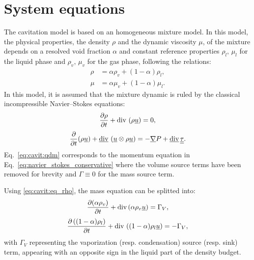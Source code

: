 \section{System equations}
\label{sec:cavit:system_equations}
The cavitation model is based on an homogeneous mixture model. In this
model, the physical properties, the density $\rho$ and the dynamic
viscosity $\mu$, of the mixture depends on a resolved void fraction
$\alpha$ and constant reference properties $\rho_l, \, \mu_l$ for the
liquid phase and $\rho_v, \, \mu_v$ for the gas phase, following the
relations:
\begin{align}
\label{eq:cavit:eq_rho}\rho&= \alpha\rho_v+(1-\alpha)\rho_l, \\
\label{eq:cavit:eq_mu}\mu&= \alpha\mu_v+(1-\alpha)\mu_l.
\end{align}
In this model, it is assumed that the mixture dynamic is ruled by the
classical incompressible Navier--Stokes equations:
\begin{equation}
\label{eq:cavit:mass}
\frac{\partial\rho}{\partial t}+\text{div}\, \left(\rho\underline{u} \right) = 0,
\end{equation}
\begin{equation}
\label{eq:cavit:qdm}
\dfrac{\partial }{\partial t}(\rho \underline{u})
+\underline{\text{div}}\, \left( \underline{u}\otimes \rho \underline{u} \right)
= - \underline{\nabla} P + \underline{\text{div}}\,  \underline{\underline{\tau}}.
\end{equation}
Eq.~\eqref{eq:cavit:qdm} corresponds to the momentum equation in
Eq.~\eqref{eq:navier_stokes_conservative} where the volume source
terms have been removed for brevity and $\Gamma\equiv0$ for the mass
source term.

Using \eqref{eq:cavit:eq_rho}, the mass equation can be splitted into:
\begin{equation}
\label{eq:cavit:eq_vf0}
\dfrac{\partial (\alpha\rho_v)}{\partial t}+\text{div}\,(\alpha\rho_v\underline{u}) = \Gamma_V,
\end{equation}
\begin{equation}
\label{eq:cavit:eq_lf0}
\dfrac{\partial \left((1-\alpha)\rho_l\right)}{\partial t}+\text{div}\,\left((1-\alpha)\rho_l\underline{u}\right) = -\Gamma_V ,
\end{equation}
with $\Gamma_V$ representing the vaporization (resp. condensation) source (resp. sink)
term, appearing with an opposite sign in the liquid part of the
density budget.

